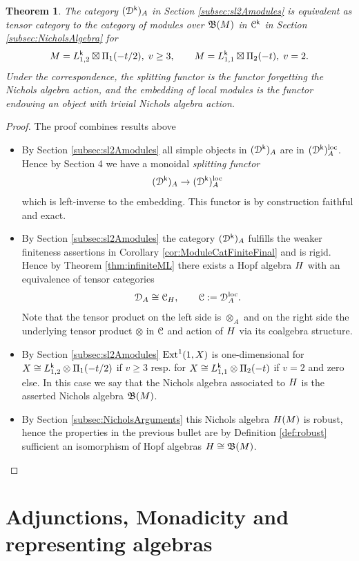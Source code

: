 \documentclass[a4paper, reqno]{amsart}
\newtheorem{theorem}{Theorem}[section]
\theoremstyle{introTheorems}
\newcommand\cC{\mathcal{C}}
\newcommand\cD{\mathcal{D}}
\newcommand{\Ext}{\textup{Ext}}
\newcommand\loc{\textup{loc}}
\renewcommand{\1}{\mathbbold{1}}
\begin{document}
\begin{theorem}\label{thm:BorelEquivalence}
The category $(\cD^\k)_A$ in Section \ref{subsec:sl2Amodules} is equivalent as tensor category to the category of modules over $\mathfrak{B}(M)$ in $\cC^\k$ in Section \ref{subsec:NicholsAlgebra} for $$M=L^{\mathsf{k}}_{1,2}\boxtimes \Pi_{1}(-t/2),\; v\geq 3,\qquad 
M=L^{\mathsf{k}}_{1,1}\boxtimes \Pi_{2}(-t),\;v=2.$$ 
Under the correspondence, the splitting functor is the functor forgetting the Nichols algebra action, and the embedding of local modules is the functor endowing an object with trivial Nichols algebra action.
\end{theorem}
\begin{proof}
The proof combines results above 
\begin{itemize}
\item By Section \ref{subsec:sl2Amodules} all simple objects in $(\cD^\k)_A$ are in $(\cD^\k)_A^\loc$. Hence by \cite{CLR23} Section 4 we have a monoidal \emph{splitting functor} \[(\catD^\k)_A\to (\catD^\k)_A^\loc\]
which is left-inverse to the embedding. This functor is by construction faithful and exact. 
\item By Section \ref{subsec:sl2Amodules} the category $(\cD^\k)_A$ fulfills the weaker finiteness assertions in Corollary \ref{cor:ModuleCatFiniteFinal} and is rigid. Hence by Theorem \ref{thm:infiniteML} there exists a Hopf algebra $H$ with an equivalence of tensor categories
$$\catD_A\cong \catC_\Nichols,\qquad
\catC:=\catD_A^\loc.$$
Note that the tensor product on the left side is $\otimes_A$ and on the right side the underlying tensor product $\otimes$ in $\mathcal{C}$ and action of $H$ via its coalgebra structure.
\item By Section \ref{subsec:sl2Amodules} $\Ext^1(1,X)$ is one-dimensional for $
X \cong L^{\mathsf{k}}_{1,2} \otimes \Pi_1(-t/2)$ if $v\geq 3$ resp. for $X \cong L^{\mathsf{k}}_{1,1} \otimes \Pi_2(-t)$ if $v=2$ and zero else. In this case we say that the Nichols algebra associated to $H$ is the asserted Nichols algebra $\mathfrak{B}(M)$.
\item By Section \ref{subsec:NicholsArguments} this Nichols algebra $H(M)$ is robust, hence the properties in the previous bullet are by Definition \ref{def:robust} sufficient an isomorphism of Hopf algebras $H\cong \mathfrak{B}(M)$.
\end{itemize}
\end{proof}

\section{Adjunctions, Monadicity and representing algebras}\label{sec:adjunction}
\end{document}
